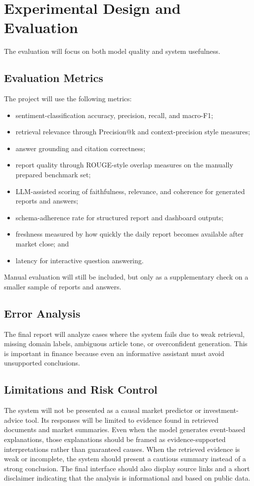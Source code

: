 \documentclass[12pt,a4paper]{report}
\begin{document}
\section{Experimental Design and Evaluation}
The evaluation will focus on both model quality and system usefulness.

\subsection{Evaluation Metrics}
The project will use the following metrics:
\begin{itemize}[leftmargin=1.6em]
    \item sentiment-classification accuracy, precision, recall, and macro-\ac{F1};
    \item retrieval relevance through Precision@k and context-precision style measures;
    \item answer grounding and citation correctness;
    \item report quality through ROUGE-style overlap measures on the manually prepared benchmark set;
    \item LLM-assisted scoring of faithfulness, relevance, and coherence for generated reports and answers;
    \item schema-adherence rate for structured report and dashboard outputs;
    \item freshness measured by how quickly the daily report becomes available after market close; and
    \item latency for interactive question answering.
\end{itemize}

Manual evaluation will still be included, but only as a supplementary check on a smaller sample of reports and answers.

\subsection{Error Analysis}
The final report will analyze cases where the system fails due to weak retrieval, missing domain labels, ambiguous article tone, or overconfident generation. This is important in finance because even an informative assistant must avoid unsupported conclusions.

\subsection{Limitations and Risk Control}
The system will not be presented as a causal market predictor or investment-advice tool. Its responses will be limited to evidence found in retrieved documents and market summaries. Even when the model generates event-based explanations, those explanations should be framed as evidence-supported interpretations rather than guaranteed causes. When the retrieved evidence is weak or incomplete, the system should present a cautious summary instead of a strong conclusion. The final interface should also display source links and a short disclaimer indicating that the analysis is informational and based on public data.
\end{document}

